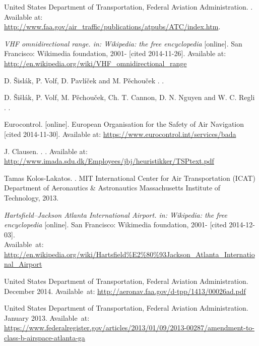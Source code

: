 \begin{thebibliography}{1}
United States Department of Transportation, Federal Aviation Administration.
.
\newblock Available at: \url{http://www.faa.gov/air_traffic/publications/atpubs/ATC/index.htm}.

{\em VHF omnidirectional range. in: Wikipedia: the free encyclopedia} [online].
\newblock San Francisco: Wikimedia foundation, 2001- [cited 2014-11-26].
\newblock Available at: \url{http://en.wikipedia.org/wiki/VHF_omnidirectional_range}

D. Šislák, P. Volf, D. Pavlíček and M. Pěchouček
.
.

D. Šišlák, P. Volf, M. Pěchouček, Ch. T. Cannon, D. N. Nguyen and W. C. Regli
.
.

Eurocontrol.
 [online].
\newblock European Organisation for the Safety of Air Navigation [cited 2014-11-30].
\newblock Available at: \url{https://www.eurocontrol.int/services/bada}

J. Clausen.
.
.
\newblock Available at: \url{http://www.imada.sdu.dk/Employees/jbj/heuristikker/TSPtext.pdf}

Tamas Kolos-Lakatos.
.
\newblock MIT International Center for Air Transportation (ICAT) Department of Aeronautics \& Astronautics Massachusetts Institute of Technology, 2013.

{\em Hartsfield–Jackson Atlanta International Airport. in: Wikipedia: the free encyclopedia} [online].
\newblock San Francisco: Wikimedia foundation, 2001- [cited 2014-12-03]. \\
\newblock Available~at: \url{http://en.wikipedia.org/wiki/Hartsfield\%E2\%80\%93Jackson_Atlanta_International_Airport}

United States Department of Transportation, Federal Aviation Administration.
 December 2014.
\newblock Available~at: \url{http://aeronav.faa.gov/d-tpp/1413/00026ad.pdf}

United States Department of Transportation, Federal Aviation Administration.
 January 2013.
\newblock Available~at: \url{https://www.federalregister.gov/articles/2013/01/09/2013-00287/amendment-to-class-b-airspace-atlanta-ga}

\end{thebibliography}
\newpage